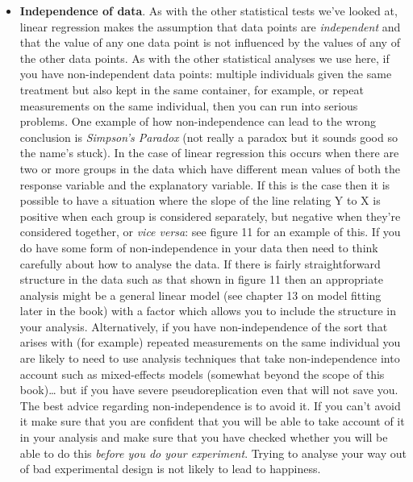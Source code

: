 \documentclass[
]{book}
\providecommand{\tightlist}{%
  \setlength{\itemsep}{0pt}\setlength{\parskip}{0pt}}
\begin{document}
\begin{itemize}
\tightlist
\item
  \textbf{Independence of data}. As with the other statistical tests we've looked at, linear regression makes the assumption that data points are \emph{independent} and that the value of any one data point is not influenced by the values of any of the other data points. As with the other statistical analyses we use here, if you have non-independent data points: multiple individuals given the same treatment but also kept in the same container, for example, or repeat measurements on the same individual, then you can run into serious problems. One example of how non-independence can lead to the wrong conclusion is \emph{Simpson's Paradox} (not really a paradox but it sounds good so the name's stuck). In the case of linear regression this occurs when there are two or more groups in the data which have different mean values of both the response variable and the explanatory variable. If this is the case then it is possible to have a situation where the slope of the line relating Y to X is positive when each group is considered separately, but negative when they're considered together, or \emph{vice versa}: see figure 11 for an example of this. If you do have some form of non-independence in your data then need to think carefully about how to analyse the data. If there is fairly straightforward structure in the data such as that shown in figure 11 then an appropriate analysis might be a general linear model (see chapter 13 on model fitting later in the book) with a factor which allows you to include the structure in your analysis. Alternatively, if you have non-independence of the sort that arises with (for example) repeated measurements on the same individual you are likely to need to use analysis techniques that take non-independence into account such as mixed-effects models (somewhat beyond the scope of this book)\ldots{} but if you have severe pseudoreplication even that will not save you. The best advice regarding non-independence is to avoid it. If you can't avoid it make sure that you are confident that you will be able to take account of it in your analysis and make sure that you have checked whether you will be able to do this \emph{before you do your experiment}. Trying to analyse your way out of bad experimental design is not likely to lead to happiness.
\end{itemize}
\end{document}
